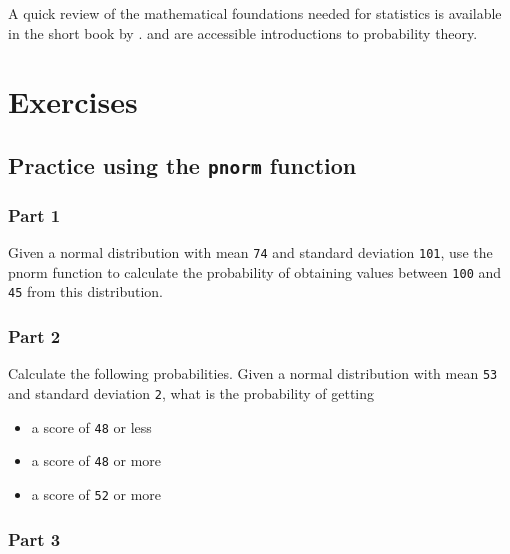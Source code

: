 \documentclass[12pt,]{krantz}
\providecommand{\tightlist}{%
  \setlength{\itemsep}{0pt}\setlength{\parskip}{0pt}}
\theoremstyle{definition}
\theoremstyle{definition}
\theoremstyle{definition}
\theoremstyle{remark}
\begin{document}
A quick review of the mathematical foundations needed for statistics is available in the short book by \citet{fox2009mathematical}. \citet{morin2016probability} and \citet{blitzstein2014introduction} are accessible introductions to probability theory.

\hypertarget{exercises}{%
\section{Exercises}\label{exercises}}

\hypertarget{practice-using-the-pnorm-function}{%
\subsection{\texorpdfstring{Practice using the \texttt{pnorm} function}{Practice using the pnorm function}}\label{practice-using-the-pnorm-function}}

\hypertarget{part-1}{%
\subsubsection{Part 1}\label{part-1}}

Given a normal distribution with mean \texttt{74} and standard deviation \texttt{101}, use the pnorm function to calculate the probability of obtaining values between \texttt{100} and \texttt{45} from this distribution.

\hypertarget{part-2}{%
\subsubsection{Part 2}\label{part-2}}

Calculate the following probabilities.
Given a normal distribution with mean \texttt{53} and standard deviation \texttt{2}, what is the probability of getting

\begin{itemize}
\tightlist
\item
  a score of \texttt{48} or less
\item
  a score of \texttt{48} or more
\item
  a score of \texttt{52} or more
\end{itemize}

\hypertarget{part-3}{%
\subsubsection{Part 3}\label{part-3}}
\end{document}
